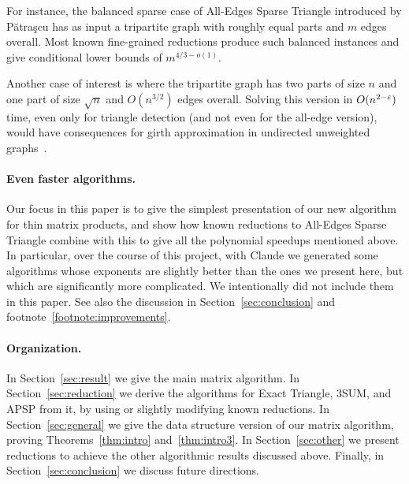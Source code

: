 For instance, 
the balanced sparse case of All-Edges Sparse Triangle introduced by P{\u a}tra{\c s}cu \cite{Pat10} has as input a tripartite graph with roughly equal parts and $m$ edges overall. Most known fine-grained reductions produce such balanced instances and give conditional lower bounds of $m^{4/3-o(1)}$.

Another case of interest is where the tripartite graph has two parts of size $n$ and one part of size $\sqrt n$ and $O(n^{3/2})$ edges overall. Solving this version in $O(n^{2-\varepsilon})$ time, even only for triangle detection (and not even for the all-edge version), would have consequences for girth approximation in undirected unweighted graphs~\cite{RV12}.

\paragraph{Even faster algorithms.}
Our focus in this paper is to give the simplest presentation of our new algorithm for thin matrix products, and show how known reductions to All-Edges Sparse Triangle combine with this to give all the polynomial speedups mentioned above. In particular, over the course of this project, with Claude we generated some algorithms whose exponents are slightly better than the ones we present here, but which are significantly more complicated. We intentionally did not include them in this paper. See also the discussion in Section~\ref{sec:conclusion} and footnote~\ref{footnote:improvements}.

\paragraph{Organization.}
In Section~\ref{sec:result} we give the main matrix algorithm. In Section~\ref{sec:reduction} we derive the algorithms for Exact Triangle, $3$SUM, and APSP from it, by using or slightly modifying known reductions. In Section~\ref{sec:general} we give the data structure version of our matrix algorithm, proving Theorems~\ref{thm:intro} and~\ref{thm:intro3}. In Section~\ref{sec:other} we present reductions to achieve the other algorithmic results discussed above. Finally, in Section~\ref{sec:conclusion} we discuss future directions.
